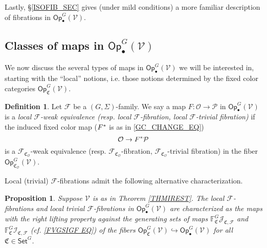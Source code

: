 \documentclass[a4paper,10pt
 ,final
]{article}%
\numberwithin{equation}{section}
\numberwithin{figure}{section}
\newtheorem{proposition}[equation]{Proposition}%
\theoremstyle{definition} %
\newtheorem{definition}[equation]{Definition}%
\newcommand{\F}{\ensuremath{\mathcal F}}
\newcommand{\V}{\ensuremath{\mathcal V}}
\renewcommand{\O}{\ensuremath{\mathcal O}}
\renewcommand{\P}{\ensuremath{\mathcal P}}
\newcommand{\1}{\ensuremath{\mathbbm 1}}%
\begin{document}
Lastly, \S \ref{ISOFIB_SEC}
gives (under mild conditions) a more familiar description of fibrations in $\mathsf{Op}^G_\bullet(\V)$.





\subsection{Classes of maps in $\mathsf{Op}^G_\bullet(\mathcal V)$}
\label{MAPSOPG_SEC}


We now discuss the several types of maps in 
$\mathsf{Op}^G_\bullet(\V)$ we will be interested in,
starting with the ``local'' notions, 
i.e. those notions determined by the fixed color categories $\mathsf{Op}_{\mathfrak{C}}^G(\V)$.



\begin{definition}
Let $\F$ be a $(G, \Sigma)$-family.
%
We say a map $F: \O \to \P$ in $\mathsf{Op}^G_\bullet(\V)$
is a \emph{local $\F$-weak equivalence (resp. local $\F$-fibration, local $\F$-trivial fibration)}
if the induced fixed color map
($F^{\**}$ is as in \eqref{GC_CHANGE_EQ})
\[\O \to F^{\**} \P\]
is a $\F_{\mathfrak{C}_{\O}}$-weak equivalence (resp. $\F_{\mathfrak{C}_{\O}}$-fibration, $\F_{\mathfrak{C}_{\O}}$-trivial fibration) in the fiber $\mathsf{Op}^G_{\mathfrak{C}_{\O}}(\V)$.
\end{definition}


Local (trivial) $\F$-fibrations admit the following alternative characterization.



\begin{proposition}\label{LOCALTCHAR PROP}
Suppose $\V$ is as in Theorem \ref{THMIREST}.
The local $\F$-fibrations
and local trivial $\F$-fibrations
in $\mathsf{Op}^G_\bullet(\V)$
are characterized as the maps with the right lifting property against the generating sets of maps 
$\mathbb{F}^G_{\mathfrak{C}}\mathcal{J}_{\mathfrak{C},\mathcal{F}}$ and  $\mathbb{F}^G_{\mathfrak{C}}\mathcal{I}_{\mathfrak{C},\mathcal{F}}$
(cf. \eqref{FVGSIGF EQ})
of the fibers 
$\mathsf{Op}^G_{\mathfrak{C}}(\V) \hookrightarrow \mathsf{Op}^G_\bullet(\V)$
for all $\mathfrak{C} \in \mathsf{Set}^G$.
\end{proposition}
\end{document}
